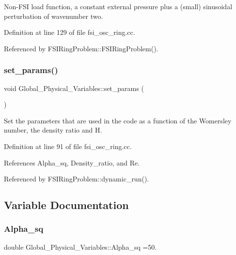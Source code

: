 Non-\/\+F\+SI load function, a constant external pressure plus a (small) sinusoidal perturbation of wavenumber two. 

Definition at line 129 of file fsi\+\_\+osc\+\_\+ring.\+cc.



Referenced by F\+S\+I\+Ring\+Problem\+::\+F\+S\+I\+Ring\+Problem().

\mbox{\label{namespaceGlobal__Physical__Variables_a5928252d8e7440b329065c223926d4d2}} 
\subsubsection{\texorpdfstring{set\+\_\+params()}{set\_params()}}
{\footnotesize\ttfamily void Global\+\_\+\+Physical\+\_\+\+Variables\+::set\+\_\+params (\begin{DoxyParamCaption}{ }\end{DoxyParamCaption})}



Set the parameters that are used in the code as a function of the Womersley number, the density ratio and H. 



Definition at line 91 of file fsi\+\_\+osc\+\_\+ring.\+cc.



References Alpha\+\_\+sq, Density\+\_\+ratio, and Re.



Referenced by F\+S\+I\+Ring\+Problem\+::dynamic\+\_\+run().



\subsection{Variable Documentation}
\mbox{\label{namespaceGlobal__Physical__Variables_a056817f9a80034eff75fcf94c44b08cd}} 
\subsubsection{\texorpdfstring{Alpha\+\_\+sq}{Alpha\_sq}}
{\footnotesize\ttfamily double Global\+\_\+\+Physical\+\_\+\+Variables\+::\+Alpha\+\_\+sq =50.}



